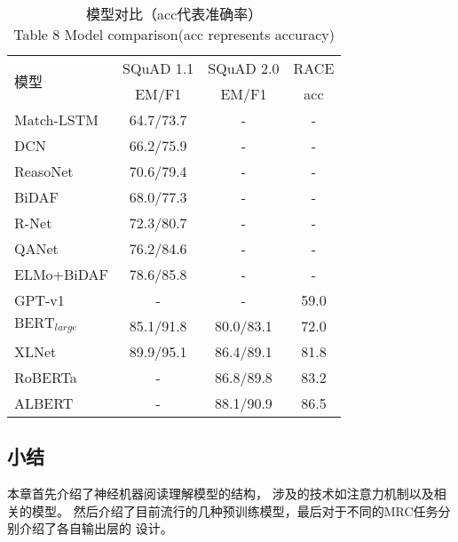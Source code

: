 \documentclass{article}
\newcommand{\upcite}[1]{\textsuperscript{\textsuperscript{\cite{#1}}}}
\begin{document}
\begin{table}[ht]
	\centering
	\caption{模型对比（acc代表准确率）\\ Table 8 Model comparison(acc represents accuracy)}
	\begin{tabular}{l c c c}
		\toprule
		\multirow{2}{*}{模型}&SQuAD 1.1\upcite{SQuAD1}& SQuAD 2.0\upcite{SQuAD2} & RACE\upcite{RACE}\\
		\cmidrule(lr){2-2} \cmidrule(lr){3-3} \cmidrule(lr){4-4}
		&EM/F1&EM/F1& acc \\
		\midrule
		Match-LSTM\upcite{MatchLSTM}& 64.7/73.7 & -&-\\
		\midrule
		DCN\upcite{DCN}& 66.2/75.9 &-&-\\
		\midrule
		ReasoNet\upcite{Reasonet}&70.6/79.4 &-&-\\
		\midrule
		BiDAF\upcite{BiDAF}&68.0/77.3 &-&-\\
		\midrule
		R-Net\upcite{RNet}&72.3/80.7 &-&-\\
		\midrule
		QANet\upcite{QANet}& 76.2/84.6&-&-\\
		\midrule
		ELMo+BiDAF\upcite{ELMo}&78.6/85.8&-&-\\
		\midrule
		GPT-v1\upcite{GPT}&-&-&59.0\\
		\midrule
		$\text{BERT}_{large}$\upcite{BERT}& 85.1/91.8 &80.0/83.1&72.0\\
		\midrule
		XLNet\upcite{XLNet}&89.9/95.1&86.4/89.1 &81.8\\
		\midrule
		RoBERTa\upcite{RoBERTa}&-&86.8/89.8 &83.2\\
		\midrule
		ALBERT\upcite{ALBERT}&-&88.1/90.9 &86.5\\
		\bottomrule
	\end{tabular}
\end{table}

\subsection{小结}
本章首先介绍了神经机器阅读理解模型的结构，
涉及的技术如注意力机制以及相关的模型。
然后介绍了目前流行的几种预训练模型，最后对于不同的MRC任务分别介绍了各自输出层的
设计。
\end{document}
